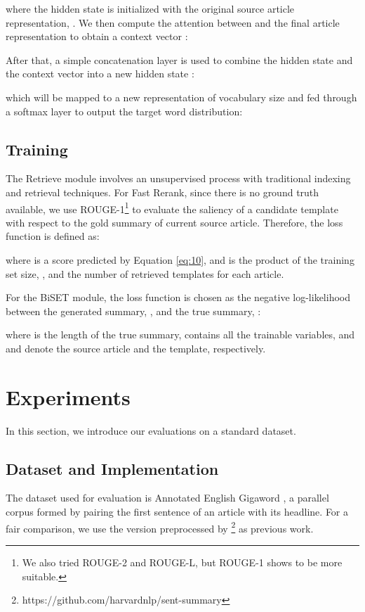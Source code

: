 \documentclass[11pt,a4paper]{article}
\begin{document}
\begin{spacing}{1.0}
where the hidden state is initialized with the original source article representation, . We then compute the attention between  and the final article representation  to obtain a context vector :

After that, a simple concatenation layer is used to combine the hidden state  and the context vector  into a new hidden state :

which will be mapped to a new representation of vocabulary size and fed through a softmax layer to output the target word distribution:



\subsection{Training}
The Retrieve module involves an unsupervised process with traditional indexing and retrieval techniques. For Fast Rerank, since there is no ground truth available, we use ROUGE-1\footnote{We also tried ROUGE-2 and ROUGE-L, but ROUGE-1 shows to be more suitable.} \cite{Lin2003Automatic} to evaluate the saliency of a candidate template with respect to the gold summary of current source article. Therefore, the loss function is defined as:

where  is a score predicted by Equation \ref{eq:10}, and  is the product of the training set size, , and the number of retrieved templates for each article.

For the BiSET module, the loss function is chosen as the negative log-likelihood between the generated summary, , and the true summary, :

where  is the length of the true summary,  contains all the trainable variables, and  and  denote the source article and the template, respectively.

\section{Experiments}
In this section, we introduce our evaluations on a standard dataset.

\subsection{Dataset and Implementation}
The dataset used for evaluation is Annotated English Gigaword \cite{Napoles2012Annotated}, a parallel corpus formed by pairing the first sentence of an article with its headline. For a fair comparison, we use the version preprocessed by \footnote{ https://github.com/harvardnlp/sent-summary} as previous work.


\end{spacing}
\end{document}
